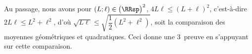 \begin{remark}
	Au passage, nous avons pour $(L ; \ell) \in \big( \RRsp \big)^2$, $4 L \ell \leq (L + \ell)^2$, c'est-à-dire $2 L \ell \leq L^2 + \ell^2$, d'où $\sqrt{L \ell} \leq \sqrt{\dfrac12 (L^2 + \ell^2)}$, soit la comparaison des moyennes géométriques et quadratiques. Ceci donne une 3\ieme\ preuve en s'appuyant sur cette comparaison.
\end{remark}
